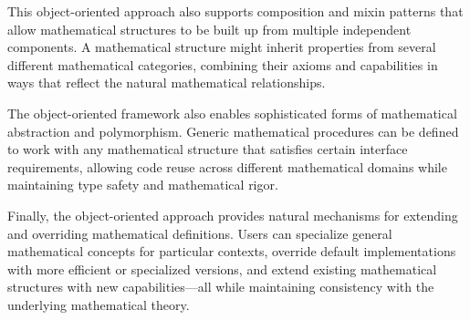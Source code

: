 This object-oriented approach also supports composition and mixin patterns that allow mathematical structures to be built up from multiple independent components.
A mathematical structure might inherit properties from several different mathematical categories, combining their axioms and capabilities in ways that reflect the natural mathematical relationships.

The object-oriented framework also enables sophisticated forms of mathematical abstraction and polymorphism.
Generic mathematical procedures can be defined to work with any mathematical structure that satisfies certain interface requirements, allowing code reuse across different mathematical domains while maintaining type safety and mathematical rigor.

Finally, the object-oriented approach provides natural mechanisms for extending and overriding mathematical definitions.
Users can specialize general mathematical concepts for particular contexts, override default implementations with more efficient or specialized versions, and extend existing mathematical structures with new capabilities—all while maintaining consistency with the underlying mathematical theory.